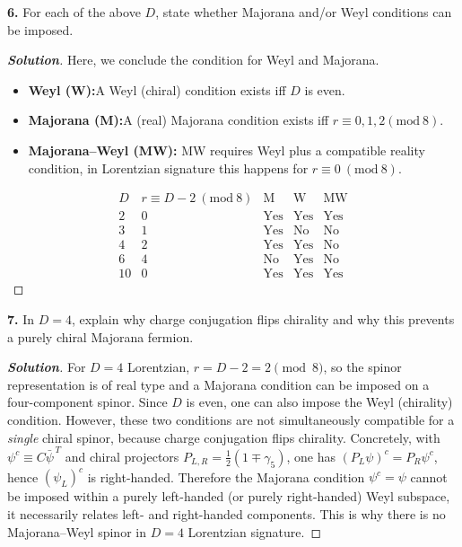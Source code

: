 \documentclass[11pt]{article}
\newenvironment{solution}[1][]{\begin{proof}[\textbf{Solution}]}{\end{proof}}
\begin{document}
\begin{tcolorbox}[problem]
\textbf{6.} For each of the above $D$, state whether Majorana and/or Weyl conditions can be imposed.
\end{tcolorbox}
\begin{solution}[13.6]
Here, we conclude the condition for Weyl and Majorana.

\begin{itemize}
	\item \textbf{Weyl (W):}A Weyl (chiral) condition exists iff $D$ is even.
	\item\textbf{Majorana (M):}A (real) Majorana condition exists iff $r\equiv 0,1,2(\mathrm{mod}\ 8)$.
	\item \textbf{Majorana--Weyl (MW):} MW requires Weyl plus a compatible reality condition, in Lorentzian signature this happens for $r\equiv 0\ (\mathrm{mod}\ 8)$.
\end{itemize}
	
	\[
	\begin{array}{c|c|c|c|c}
		D & r\equiv D-2\ (\mathrm{mod}\ 8) & \mathrm{M} & \mathrm{W} & \mathrm{MW}\\
		\hline
		2  & 0 & \text{Yes} & \text{Yes} & \text{Yes}\\
		3  & 1 & \text{Yes} & \text{No}  & \text{No}\\
		4  & 2 & \text{Yes} & \text{Yes} & \text{No}\\
		6  & 4 & \text{No} & \text{Yes} & \text{No}\\
		10 & 0 & \text{Yes} & \text{Yes} & \text{Yes}
	\end{array}
	\]
	
\end{solution}
\begin{tcolorbox}[problem]
\textbf{7.} In $D=4$, explain why charge conjugation flips chirality and why this prevents a purely chiral Majorana fermion.
\end{tcolorbox}
\begin{solution}[13.7]
	For \(D=4\) Lorentzian, \(r=D-2=2\!\!\pmod{8}\), so the spinor representation is of real type and a Majorana condition can be imposed on a four-component spinor. Since \(D\) is even, one can also impose the Weyl (chirality) condition. However, these two conditions are not simultaneously compatible for a \emph{single} chiral spinor, because charge conjugation flips chirality. Concretely, with \(\psi^c \equiv C\bar\psi^{\,T}\) and chiral projectors \(P_{L,R}=\tfrac12(1\mp\gamma_5)\), one has \((P_L\psi)^c = P_R\psi^c\), hence \((\psi_L)^c\) is right-handed. Therefore the Majorana condition \(\psi^c=\psi\) cannot be imposed within a purely left-handed (or purely right-handed) Weyl subspace, it necessarily relates left- and right-handed components. This is why there is no Majorana--Weyl spinor in \(D=4\) Lorentzian signature.
\end{solution}
\end{document}
